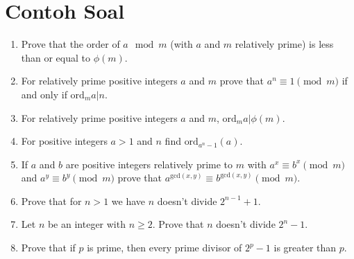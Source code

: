 \documentclass[11pt]{scrartcl}
\begin{document}
\section{Contoh Soal}
\begin{enumerate}
    \item Prove that the order of $a \mod m$ (with $a$ and $m$ relatively prime) is less than or equal to $\phi(m)$.

    \item For relatively prime positive integers $a$ and $m$ prove that $a^n \equiv 1 \pmod{m}$ if and only if $\text{ord}_m a | n$.

    \item For relatively prime positive integers $a$ and $m$, $\text{ord}_m a | \phi(m)$.
    
    \item For positive integers $a > 1$ and $n$ find $\text{ord}_{a^n-1} (a)$.

    \item If $a$ and $b$ are positive integers relatively prime to $m$ with $a^x \equiv b^x \pmod{m}$ and $a^y \equiv b^y \pmod{m}$ prove that $a^{\text{gcd}(x,y)} \equiv b^{\text{gcd}(x,y)} \pmod{m}$.

    \item Prove that for $n > 1$ we have $n$ doesn't divide $2^{n-1} + 1$.

    \item Let $n$ be an integer with $n \geq 2$. Prove that $n$ doesn’t divide $2^n - 1$.

    \item Prove that if $p$ is prime, then every prime divisor of $2^p - 1$ is greater than $p$.
\end{enumerate}
\end{document}
